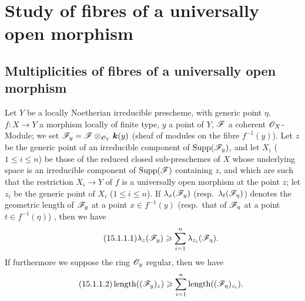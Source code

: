 \section{Study of fibres of a universally open morphism}
\label{section:IV.15}

\subsection{Multiplicities of fibres of a universally open morphism}
\label{subsection:IV.15.1}

\begin{proposition}[15.1.1]
\label{IV.15.1.1}
Let $Y$ be a locally Noetherian irreducible prescheme, with generic point $\eta$, $f:X\to Y$ a morphism locally of finite type, $y$ a point of $Y$, $\mathscr{F}$ a coherent $\mathscr{O}_X$-Module;
we set $\mathscr{F}_y=\mathscr{F}\otimes_{\mathscr{O}_Y}\boldsymbol{k}(y)$ \textup{(sheaf of modules on the fibre $f^{-1}(y)$)}.
Let $z$ be the generic point of an irreducible component of $\operatorname{Supp}(\mathscr{F}_y)$, and let $X_i$ ($1\leqslant i\leqslant n$) be those of the reduced closed sub-preschemes of $X$ whose underlying space is an irreducible component of $\operatorname{Supp}(\mathscr{F})$ containing $z$, and which are such that the restriction $X_i\to Y$ of $f$ is a universally open morphism at the point $z$; let $z_i$ be the generic point of $X_i$ ($1\leqslant i\leqslant n$).
If $\lambda_x(\mathscr{F}_y)$ (\textup{resp.}~$\lambda_t(\mathscr{F}_\eta)$) denotes the geometric length of $\mathscr{F}_y$ at a point $x\in f^{-1}(y)$ (\textup{resp.}~that of $\mathscr{F}_\eta$ at a point $t\in f^{-1}(\eta)$) , then we have
\[
\tag{15.1.1.1}
\label{IV.15.1.1.1}
  \lambda_z(\mathscr{F}_y)\geqslant\sum_{i=1}^{n}\lambda_{z_i}(\mathscr{F}_\eta).
\]
If furthermore we suppose the ring $\mathscr{O}_y$ regular, then we have
\[
\tag{15.1.1.2}
\label{IV.15.1.1.2}
  \operatorname{length}((\mathscr{F}_y)_z)\geqslant\sum_{i=1}^{n}\operatorname{length}((\mathscr{F}_\eta)_{z_i}).
\]
\end{proposition}

